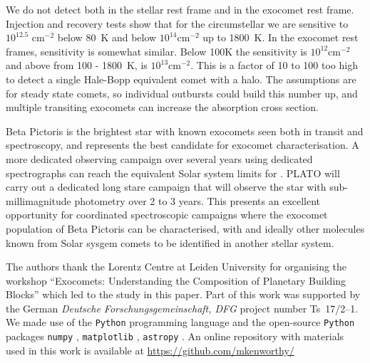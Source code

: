 \documentclass{aa}
\newcommand{\bp}{Beta Pictoris}
\begin{document}
We do not detect  both in the stellar rest frame and in the exocomet rest frame.
%
Injection and recovery tests show that for the circumstellar  we are sensitive to $10^{12.5}$ cm$^{-2}$ below 80~K and below $10^{14}$cm$^{-2}$ up to 1800~K.
%
In the exocomet rest frames, sensitivity is somewhat similar.
%
Below 100K the sensitivity is $10^{12}$cm$^{-2}$ and above from 100 - 1800~K, is $10^{13}$cm$^{-2}$.
%
This is a factor of 10 to 100 too high to detect a single Hale-Bopp equivalent comet with a  halo.
%
%
%
The assumptions are for steady state comets, so individual outbursts could build this number up, and multiple transiting exocomets can increase the absorption cross section.

\bp{} is the brightest star with known exocomets seen both in transit and spectroscopy, and represents the best candidate for exocomet characterisation.
%
A more dedicated observing campaign over several years using dedicated spectrographs can reach the equivalent Solar system limits for .
%
PLATO will carry out a dedicated long stare campaign that will observe the star with sub-millimagnitude photometry over 2 to 3 years.
%
This presents an excellent opportunity for coordinated spectroscopic campaigns where the exocomet population of Beta Pictoris can be characterised, with  and ideally other molecules known from Solar sysgem comets to be identified in another stellar system.

\begin{acknowledgements}

The authors thank the Lorentz Centre at Leiden University for organising the workshop ``Exocomets: Understanding the Composition of Planetary Building Blocks'' which led to the study in this paper. 
%
Part of this work was supported by the German \emph{Deut\-sche For\-schungs\-ge\-mein\-schaft, DFG\/} project number Ts~17/2--1.
%
We made use of the {\tt Python} programming language \citep{rossum1995} and the open-source {\tt Python} packages {\tt numpy} \citep{walt2011}, {\tt matplotlib} \citep{hunter2007}, {\tt astropy} \citep{astropy2013}.
%      
An online repository with materials used in this work is available at \url{https://github.com/mkenworthy/}

\end{acknowledgements}
\end{document}
